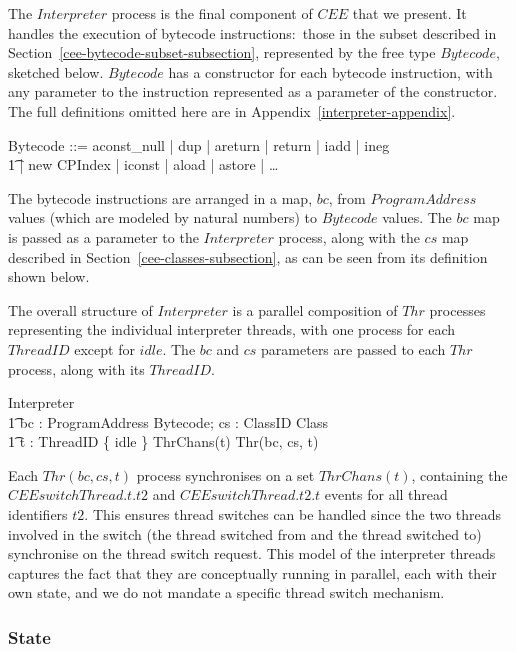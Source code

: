 The $Interpreter$ process is the final component of $CEE$ that we
present. 
It handles the execution of bytecode instructions:~those in the subset
described in Section~\ref{cee-bytecode-subset-subsection}, represented
by the free type $Bytecode$, sketched below.
$Bytecode$ has a constructor for each bytecode instruction, with any
parameter to the instruction represented as a parameter of the
constructor.
The full definitions omitted here are in
Appendix~\ref{interpreter-appendix}.
\begin{zed}
  Bytecode ::= aconst\_null | dup | areturn | return | iadd | ineg \\
  \t1 | new \ldata CPIndex \rdata | iconst \ldata \nat \rdata | aload \ldata \nat \rdata | astore \ldata \nat \rdata | \dots
\end{zed}
The bytecode instructions are arranged in a map, $bc$, from
$ProgramAddress$ values (which are modeled by natural numbers) to
$Bytecode$ values.
The $bc$ map is passed as a parameter to the $Interpreter$ process,
along with the $cs$ map described in
Section~\ref{cee-classes-subsection}, as can be seen from its
definition shown below.

The overall structure of $Interpreter$ is a parallel composition of
$Thr$ processes representing the individual interpreter threads, with
one process for each $ThreadID$ except for $idle$.
The $bc$ and $cs$ parameters are passed to each $Thr$ process, along
with its $ThreadID$.
\begin{circus}
  \circprocess Interpreter \circdef \\
  \t1 bc : ProgramAddress \pfun Bytecode; cs : ClassID \pfun Class \circspot \\
  \t1 \Parallel t : ThreadID \setminus \{ idle \} \lpar ThrChans(t) \rpar \circspot Thr(bc, cs, t)
\end{circus}
Each $Thr(bc,cs,t)$ process synchronises on a set $ThrChans(t)$,
containing the $CEEswitchThread.t.t2$ and $CEEswitchThread.t2.t$
events for all thread identifiers $t2$.
This ensures thread switches can be handled since the two threads
involved in the switch (the thread switched from and the thread
switched to) synchronise on the thread switch request.
This model of the interpreter threads captures the fact that they are
conceptually running in parallel, each with their own state, and we do
not mandate a specific thread switch mechanism.

\subsubsection*{State}

